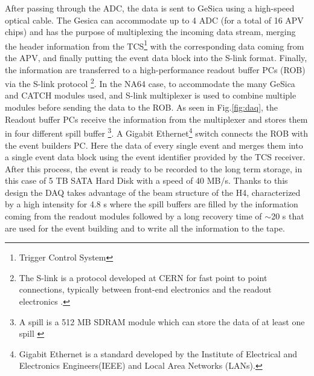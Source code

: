 After passing through the ADC, the data is sent to GeSica using a high-speed optical cable. The Gesica can accommodate up to 4 ADC (for a total of 16 APV chips) and has the purpose of multiplexing the incoming data stream, merging the header information from the TCS\footnote{Trigger Control System} with the corresponding data coming from the APV, and finally putting the event data block into the S-link format. Finally, the information are transferred to a high-performance readout buffer PCs (ROB) via the S-link protocol \footnote{The S-link is a protocol developed at CERN for fast point to point connections, typically between front-end electronics and the readout electronics \cite{s-link}.}. In the NA64 case, to accommodate the many GeSica and CATCH modules used, and S-link multiplexer is used to combine multiple modules before sending the data to the ROB. As seen in Fig.\ref{fig:daq}, the Readout buffer PCs receive the information from the multiplexer and stores them in four different spill buffer \footnote{A spill is a 512 MB SDRAM module which can store the data of at least one spill \cite{COMPASS-daq}}. A Gigabit Ethernet\footnote{Gigabit Ethernet is a standard developed by the Institute of Electrical and Electronics Engineers(IEEE) and Local Area Networks (LANs).} switch connects the ROB with the event builders PC. Here the data of every single event and merges them into a single event data block using the event identifier provided by the TCS receiver. After this process, the event is ready to be recorded to the long term storage, in this case of 5 TB SATA Hard Disk with a speed of 40 MB/s. Thanks to this design the DAQ takes advantage of the beam structure of the H4, characterized by a high intensity for 4.8 \si{\second} where the spill buffers are filled by the information coming from the readout modules followed by a long recovery time of $\sim$20 \si{\second} that are used for the event building and to write all the information to the tape.


